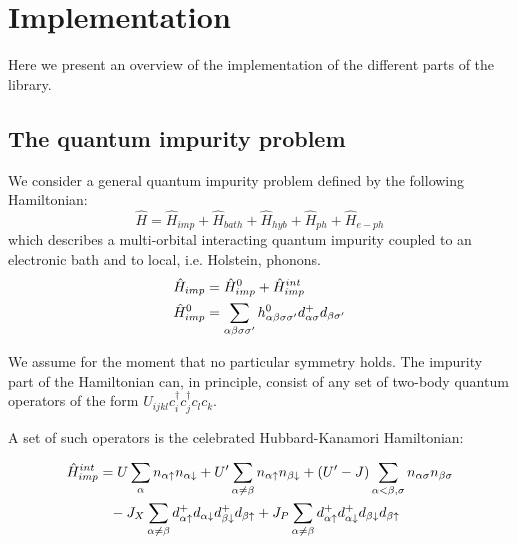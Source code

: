 \documentclass[edipack2.tex]{subfiles}
\begin{document}
\section{Implementation}\label{SecEDIpack}
Here we present an overview of the implementation of the
different parts of the \NAME library. 

\subsection{The quantum impurity problem}\label{sSecQIM}
We consider a general quantum impurity problem defined by the
following Hamiltonian:
$$
\hat{H} = \hat{H}_{imp} + \hat{H}_{bath} + \hat{H}_{hyb} + \hat{H}_{ph} + \hat{H}_{e-ph}
$$
which describes a  multi-orbital interacting quantum
impurity coupled to an electronic bath and to local, i.e. Holstein,
phonons. 
\begin{equation}\label{Himp}
  \begin{split}
    \hat{H}_{imp} & = \hat{H}^0_{imp} + \hat{H}^{int}_{imp}\\
    \hat{H}^0_{imp} & =
    \sum_{\alpha\beta\sigma\sigma'}h^{0}_{\alpha\beta\sigma\sigma'}d^{+}_{\alpha\sigma}d_{\beta\sigma'}\\
\end{split}
\end{equation}

We assume for the moment that no particular symmetry
holds. The impurity part of the Hamiltonian can, in principle, consist of any set of
two-body quantum operators of the form $U_{ijkl}c^{\dagger}_{i}c^{\dagger}_{j}c_{l}c_{k}$.

A set of such operators is the celebrated Hubbard-Kanamori Hamiltonian: 

\begin{equation}\label{Hint}
  \begin{split}
    \hat{H}^{int}_{imp} &=U\sum_{\a}n_{\a\uparrow}n_{\a\downarrow}+U'\sum_{\a\neq \b}n_{\a\uparrow}n_{\b\downarrow}+(U'-J)\sum_{\a<\b,\sigma}n_{\a\sigma}n_{\b\sigma}\\
    &{\phantom =}- J_X\sum_{\a\neq
      \b}d^{+}_{\a\uparrow}d_{\a\downarrow}d^{+}_{\b\downarrow}d_{\b\uparrow}+J_P\sum_{\a
      \neq
      \b}d^{+}_{\a\uparrow}d^{+}_{\a\downarrow}d_{\b\downarrow}d_{\b\uparrow}\\
\end{split}
\end{equation}
\end{document}
